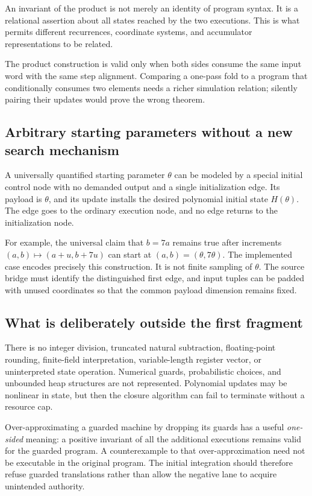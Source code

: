 An invariant of the product is not merely an identity of program syntax. It is
a relational assertion about all states reached by the two executions. This is
what permits different recurrences, coordinate systems, and accumulator
representations to be related.

The product construction is valid only when both sides consume the same input
word with the same step alignment. Comparing a one-pass fold to a program that
conditionally consumes two elements needs a richer simulation relation; silently
pairing their updates would prove the wrong theorem.

\subsection{Arbitrary starting parameters without a new search mechanism}
A universally quantified starting parameter $\theta$ can be modeled by a
special initial control node with no demanded output and a single initialization
edge. Its payload is $\theta$, and its update installs the desired polynomial
initial state $H(\theta)$. The edge goes to the ordinary execution node, and no
edge returns to the initialization node.

For example, the universal claim that $b=7a$ remains true after increments
$(a,b)\mapsto(a+u,b+7u)$ can start at $(a,b)=(\theta,7\theta)$.
The implemented case  encodes precisely this
construction. It is not finite sampling of $\theta$. The source bridge must
identify the distinguished first edge, and input tuples can be padded with
unused coordinates so that the common payload dimension remains fixed.

\subsection{What is deliberately outside the first fragment}
There is no integer division, truncated natural subtraction, floating-point
rounding, finite-field interpretation, variable-length register vector, or
uninterpreted state operation. Numerical guards, probabilistic choices, and
unbounded heap structures are not represented. Polynomial updates may be
nonlinear in state, but then the closure algorithm can fail to terminate without
a resource cap.

Over-approximating a guarded machine by dropping its guards has a useful
\emph{one-sided} meaning: a positive invariant of all the additional
executions remains valid for the guarded program. A counterexample to that
over-approximation need not be executable in the original program. The initial
integration should therefore refuse guarded translations rather than allow the
negative lane to acquire unintended authority.

